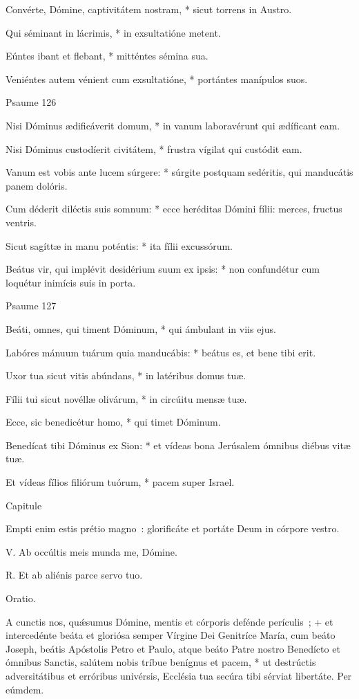 Convérte, Dómine, captivitátem nostram, * sicut torrens in Austro.

Qui séminant in lácrimis, * in exsultatióne metent.

Eúntes ibant et flebant, * mitténtes sémina sua.

Veniéntes autem vénient cum exsultatióne, * portántes manípulos suos.


Psaume 126

Nisi Dóminus ædificáverit domum, * in vanum laboravérunt qui ædíficant eam.

Nisi Dóminus custodíerit civitátem, * frustra vígilat qui custódit eam.

Vanum est vobis ante lucem súrgere: * súrgite postquam sedéritis, qui manducátis panem dolóris.

Cum déderit diléctis suis somnum: * ecce heréditas Dómini fílii: merces, fructus ventris.

Sicut sagíttæ in manu poténtis: * ita fílii excussórum.

Beátus vir, qui implévit desidérium suum ex ipsis: * non confundétur cum loquétur inimícis suis in porta.


Psaume 127

Beáti, omnes, qui timent Dóminum, * qui ámbulant in viis ejus.

Labóres mánuum tuárum quia manducábis: * beátus es, et bene tibi erit.

Uxor tua sicut vitis abúndans, * in latéribus domus tuæ.

Fílii tui sicut novéllæ olivárum, * in circúitu mensæ tuæ.

Ecce, sic benedicétur homo, * qui timet Dóminum.

Benedícat tibi Dóminus ex Sion: * et vídeas bona Jerúsalem ómnibus diébus vitæ tuæ.

Et vídeas fílios filiórum tuórum, * pacem super Israel.


Capitule

Empti enim estis prétio magno~: glorificáte et portáte Deum in córpore vestro.


V. Ab occúltis meis munda me, Dómine.

R. Et ab aliénis parce servo tuo.




Oratio.

A cunctis nos, quǽsumus Dómine, mentis et córporis defénde perículis~; + et intercedénte beáta et gloriósa semper Vírgine Dei Genitríce María, cum beáto Joseph, beátis Apóstolis Petro et Paulo, atque beáto Patre nostro Benedícto et ómnibus Sanctis, salútem nobis tríbue benígnus et pacem, * ut destrúctis adversitátibus et erróribus univérsis, Ecclésia tua secúra tibi sérviat libertáte. Per eúmdem.






